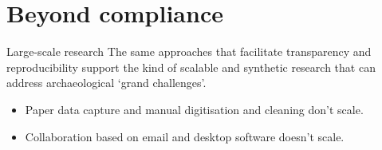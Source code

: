 \documentclass[aspectratio=169, 11pt]{beamer} %
\begin{document}

\section{Beyond compliance}

\begin{frame}{Large-scale research}
    The same approaches that facilitate transparency and reproducibility support the kind of scalable and synthetic research that can address archaeological `grand challenges'. \cite{Kintigh2014-ub}
        \begin{itemize}[label=\textbullet]
            \item Paper data capture and manual digitisation and cleaning don't scale.
            \item Collaboration based on email and desktop software doesn't scale.
    \end{itemize}
\end{frame}
\end{document}
